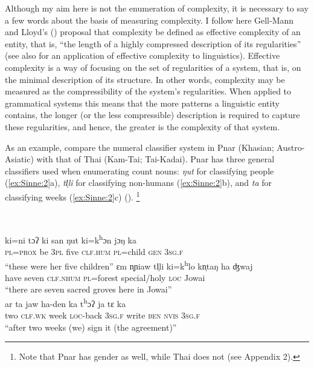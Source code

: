 \documentclass[output=collectionpaper]{langsci/langscibook}
\begin{document}
Although my aim here is not the enumeration of complexity, it is necessary to say a few words about the basis of measuring complexity. I follow here Gell-Mann and Lloyd's (\citealt*[387]{Gell-Mann2004}) proposal that complexity be defined as effective complexity of an entity, that is, ``the length of a highly compressed description of its regularities'' (see also \citealt{Dahl2004} for an application of effective complexity to linguistics). Effective complexity is a way of focusing on the set of regularities of a system, that is, on the minimal description of its structure. In other words, complexity may be measured as the compressibility of the system's regularities. When applied to grammatical systems this means that the more patterns a linguistic entity contains, the longer (or the less compressible) description is required to capture these regularities, and hence, the greater is the complexity of that system.

As an example, compare the numeral classifier system in Pnar (Khasian; Austro-Asiatic) with that of Thai (Kam-Tai; Tai-Kadai). Pnar has three general classifiers used when enumerating count nouns: \textit{ŋut} for classifying people (\ref{ex:Sinne:2}a), \textit{tl̩li} for classifying non-humans (\ref{ex:Sinne:2}b), and \textit{ta} for classifying weeks (\ref{ex:Sinne:2}c) (\citealt[124--125, 361--362]{Ring2015}).%
\footnote{Note that Pnar has gender as well, while Thai does not (see Appendix 2).
} %

\ea
\label{ex:Sinne:2}
\\
\begin{xlist}
\ex
\gll ki=ni  tɔʔ ki san ŋut ki=k\textsuperscript{h}ɔn jɔŋ ka\\
\textsc{pl=prox} be \textsc{3pl} five \textsc{clf.hum} \textsc{pl}=child \textsc{gen} \textsc{3sg.f}\\
\glt ``these were her five children''
\ex
\gll ɛm n̩ɲiaw tl̩li ki=k\textsuperscript{h}lo kn̩taŋ ha ʤwaj\\
have seven \textsc{clf.nhum} \textsc{pl}=forest special/holy \textsc{loc} Jowai\\
\glt ``there are seven sacred groves here in Jowai''\\
\ex
\gll ar ta jaw ha-den ka t\textsuperscript{h}ɔʔ ja tɛ ka\\
two \textsc{clf.wk} week \textsc{loc}{}-back \textsc{3sg.f} write \textsc{ben} \textsc{nvis} \textsc{3sg.f}\\
\glt  ``after two weeks (we) sign it (the agreement)''\\
\end{xlist}
\z
\end{document}
